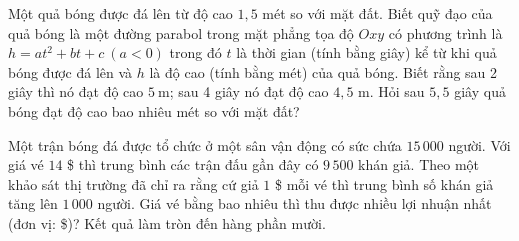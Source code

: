 \begin{bt}%
	Một quả bóng được đá lên từ độ cao $1{,}5$ mét so với mặt đất. Biết quỹ đạo của quả bóng là một đường parabol trong mặt phẳng tọa độ $Oxy$ có phương trình là $h=a t^2+b t+c~(a < 0)$ trong đó $t$ là thời gian (tính bằng giây) kể từ khi quả bóng được đá lên và $h$ là độ cao (tính bằng  mét) của quả bóng. Biết rằng sau 2 giây thì nó đạt độ cao $5 \mathrm{~m}$; sau 4 giây nó đạt độ cao $4{,}5$ m. Hỏi sau $5{,}5$ giây quả bóng đạt độ cao bao nhiêu mét so với mặt đất?
\end{bt}

\begin{bt}%
	Một trận bóng đá được tổ chức ở một sân vận động có sức chứa $15\,000$ người. Với giá vé $14$ \$ thì trung bình các trận đấu gần đây có $9\,500$ khán giả. Theo một khảo sát thị trường đã chỉ ra rằng cứ giả $1$ \$ mỗi vé thì trung bình số khán giả tăng lên $1\,000$ người. Giá  vé bằng bao nhiêu thì thu được nhiều lợi nhuận nhất (đơn vị: \$)? Kết quả làm tròn đến hàng phần mười.
\end{bt}

